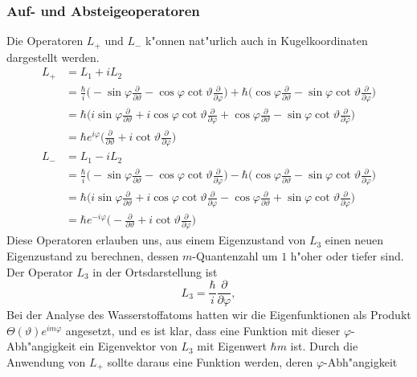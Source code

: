 \subsubsection{Auf- und Absteigeoperatoren}
Die Operatoren $L_+$ und $L_-$ k"onnen nat"urlich auch in Kugelkoordinaten
dargestellt werden.
\begin{align*}
L_+
&=
L_1+iL_2
\\
&=
\frac{\hbar}{i}\biggl(
-\sin\varphi\frac{\partial}{\partial\vartheta}
-\cos\varphi\cot\vartheta\frac{\partial}{\partial\varphi}
\biggr)
+\hbar\biggl(
\cos\varphi\frac{\partial}{\partial\vartheta}
-\sin\varphi\cot\vartheta\frac{\partial}{\partial\varphi}
\biggr)
\\
&=
\hbar\biggl(
i\sin\varphi\frac{\partial}{\partial\vartheta}
+i\cos\varphi\cot\vartheta\frac{\partial}{\partial\varphi}
+
\cos\varphi\frac{\partial}{\partial\vartheta}
-\sin\varphi\cot\vartheta\frac{\partial}{\partial\varphi}
\biggr)
\\
&=\hbar e^{i\varphi}\biggl(
\frac{\partial}{\partial\vartheta}
+
i\cot\vartheta\frac{\partial}{\partial\varphi}
\biggr)
\\
L_-
&=
L_1-iL_2
\\
&=
\frac{\hbar}{i}\biggl(
-\sin\varphi\frac{\partial}{\partial\vartheta}
-\cos\varphi\cot\vartheta\frac{\partial}{\partial\varphi}
\biggr)
-\hbar\biggl(
\cos\varphi\frac{\partial}{\partial\vartheta}
-\sin\varphi\cot\vartheta\frac{\partial}{\partial\varphi}
\biggr)
\\
&=
\hbar\biggl(
i\sin\varphi\frac{\partial}{\partial\vartheta}
+
i\cos\varphi\cot\vartheta\frac{\partial}{\partial\varphi}
-
\cos\varphi\frac{\partial}{\partial\vartheta}
+\sin\varphi\cot\vartheta\frac{\partial}{\partial\varphi}
\biggr)
\\
&=
\hbar e^{-i\varphi}
\biggl(
-
\frac{\partial}{\partial\vartheta}
+i
\cot\vartheta\frac{\partial}{\partial\varphi}
\biggr)
\end{align*}
Diese Operatoren erlauben uns, aus einem Eigenzustand von $L_3$
einen neuen Eigenzustand zu berechnen, dessen $m$-Quantenzahl 
um $1$ h"oher oder tiefer sind.
Der Operator $L_3$ in der Ortsdarstellung ist
\[
L_3=\frac{\hbar}{i}\frac{\partial}{\partial\varphi},
\]
Bei der Analyse des Wasserstoffatoms hatten wir die Eigenfunktionen
als Produkt $\Theta(\vartheta) e^{im\varphi}$ angesetzt,  und es ist
klar, dass eine Funktion mit dieser $\varphi$-Abh"angigkeit ein
Eigenvektor von $L_3$ mit Eigenwert $\hbar m$ ist. Durch die Anwendung
von $L_+$ sollte daraus eine Funktion werden, deren $\varphi$-Abh"angigkeit
